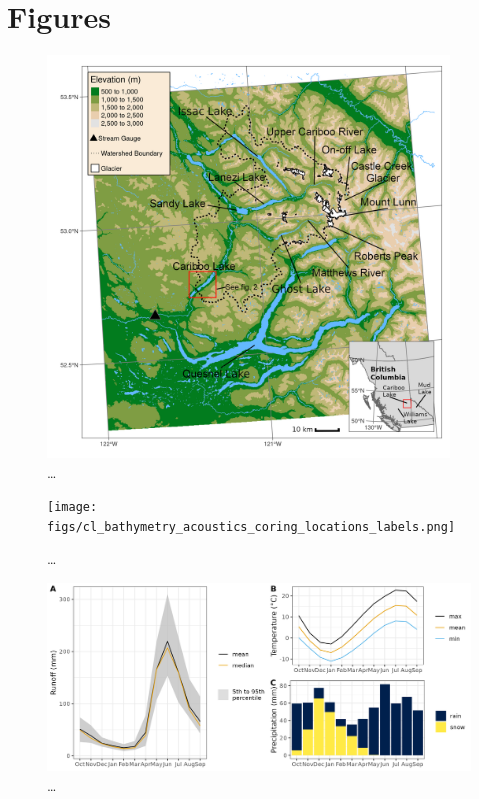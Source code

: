 \documentclass[
  letterpaper,
  DIV=11,
  numbers=noendperiod]{scrartcl}
\begin{document}
\hypertarget{figures}{%
\section{Figures}\label{figures}}

\begin{figure}

{\centering \includegraphics[width=0.95\textwidth,height=\textheight]{figs/cl_small_scale_inset_labels_gimp.png}

}

\caption{\label{fig-map-basin}\ldots{}}

\end{figure}

\begin{figure}

{\centering \texttt{[image: figs/cl\_bathymetry\_acoustics\_coring\_locations\_labels.png]}

}

\caption{\label{fig-map-lake}\ldots{}}

\end{figure}

\begin{figure}

{\centering \includegraphics[width=1\textwidth,height=\textheight]{figs/cariboo_combine_climate_hydro.png}

}

\caption{\label{fig-cl-hydro}\ldots{}}

\end{figure}
\end{document}
